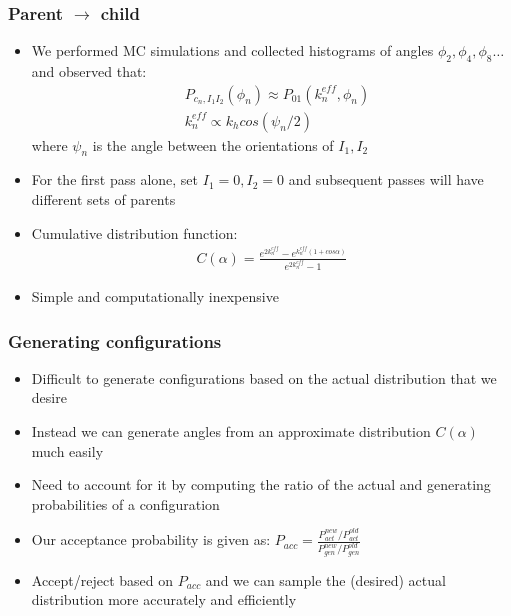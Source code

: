 \documentclass[xcolor=svgnames]{beamer}
\begin{document}
	\begin{frame}
	\frametitle{Parent $\to$ child}
	\begin{itemize}%
	\item We performed MC simulations and collected histograms of angles $\phi_2 , \phi_4, \phi_8 \ldots$ and observed that:
	\begin{align*}
	&P_{c_n,I_1 I_2} (\phi_n) \approx P_{01} (k_n^{eff},\phi_n) \\
	&k_n^{eff} \propto k_h cos(\psi_n/2)
	\end{align*}
	where $\psi_n$ is the angle between the orientations of $I_1 , I_2$
	\item For the first pass alone, set $I_1 = 0, I_2 = 0$ and subsequent passes will have different sets of parents
	\item Cumulative distribution function:
	\begin{align}
	C(\alpha) = \frac{e^{2k_n^{eff}} - e^{k_n^{eff} (1 + cos \alpha)}}{e^{2k_n^{eff}} - 1}
	\end{align}
	\item Simple and \alert{computationally inexpensive}
	\end{itemize}
	\end{frame}

	\begin{frame}
	\frametitle{Generating configurations}
	\begin{itemize}
	\item Difficult to generate configurations based on the actual distribution that we desire
	\item Instead we can generate angles from an approximate distribution $C(\alpha)$ much easily
	\item Need to account for it by computing the ratio of the actual and generating probabilities of a configuration
	\item Our acceptance probability is given as: $P_{acc} = \frac{P_{act}^{new}/P_{act}^{old}}{P_{gen}^{new}/P_{gen}^{old}}$
	\item Accept/reject based on $P_{acc}$ and we can sample the (desired) actual distribution more \alert{accurately and efficiently}
	\end{itemize}
	\end{frame}
	
\end{document}
